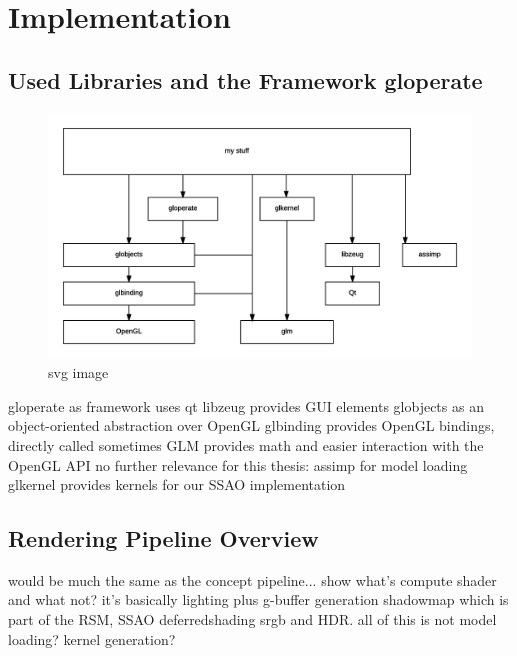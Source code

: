 

\chapter{Implementation}

\section{Used Libraries and the Framework gloperate}

\begin{figure}[htbp]
  \centering
  \includegraphics{graphics/Architecture}
  \caption{svg image}
\end{figure}

\begin{outline}
\1 gloperate as framework
    \2 uses qt
\1 libzeug provides GUI elements
\1 globjects as an object-oriented abstraction over OpenGL
\1 glbinding provides OpenGL bindings, directly called sometimes
\1 GLM provides math and easier interaction with the OpenGL API
\1 no further relevance for this thesis:
    \2 assimp for model loading
    \2 glkernel provides kernels for our SSAO implementation
\end{outline}

\section{Rendering Pipeline Overview}
\begin{outline}
\1 would be much the same as the concept pipeline...
\1 show what's compute shader and what not?
\1 it's basically lighting plus
    \2 g-buffer generation
    \2 shadowmap which is part of the RSM,
    \2 SSAO
    \2 deferredshading
    \2 srgb and HDR.
    \2 all of this is not
\1 model loading?
\1 kernel generation?
\end{outline}


